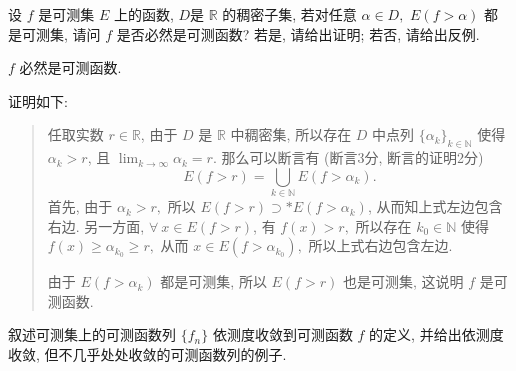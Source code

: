 \begin{question}[points = 10]
设 $f$ 是可测集 $E$ 上的函数, $D$是 $\mathbb{R}$ 的稠密子集, 若对任意 $\alpha\in D,$ $E(f > \alpha)$ 都是可测集, 请问 $f$ 是否必然是可测函数? 若是, 请给出证明; 若否, 请给出反例.

\end{question}

\begin{solution}
\(f\) 必然是可测函数. 

证明如下: 

\begin{quote}
任取实数 \(r \in \mathbb{R}\), 由于 \(D\) 是 \(\mathbb{R}\) 中稠密集, 所以存在 \(D\) 中点列 \(\{\alpha_k\}_{k \in \mathbb{N}}\) 使得 \(\alpha_k > r\), 且 \(\displaystyle \lim_{k \to \infty} \alpha_k = r\). 那么可以断言有 (断言3分, 断言的证明2分)
\[E(f > r) = \bigcup_{k \in \mathbb{N}} E(f > \alpha_k).\]
首先, 由于 \(\alpha_k > r,\) 所以 \(E(f > r) \supset* E(f > \alpha_k)\), 从而知上式左边包含右边. 另一方面, \(\forall ~ x \in E(f > r)\), 有 \(f(x) > r,\) 所以存在 \(k_0 \in \mathbb{N}\) 使得 \(f(x) \geqslant \alpha_{k_0} \geqslant r,\) 从而 \(x \in E(f > \alpha_{k_0}),\) 所以上式右边包含左边.

由于 \(E(f > \alpha_k)\) 都是可测集, 所以 \(E(f > r)\) 也是可测集, 这说明 \(f\) 是可测函数.
\end{quote}
\end{solution}


\begin{question}[points = 10]
叙述可测集上的可测函数列 $\{f_n\}$ 依测度收敛到可测函数 $f$ 的定义, 并给出依测度收敛, 但不几乎处处收敛的可测函数列的例子.

\end{question}

